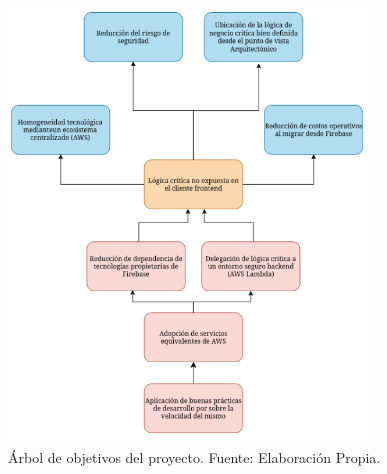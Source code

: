 \newcommand\arbolDeObjetivosCaption{Árbol de objetivos del proyecto. \hspace{1em}}
\begin{figure}[H]
  \centering
  \includegraphics[width=0.85\textwidth]{img/figures/fig7-arbol-de-objetivos.png}
  \caption[\arbolDeObjetivosCaption]{\arbolDeObjetivosCaption Fuente: Elaboración Propia.}
  \label{fig:arbol_de_objetivos}
\end{figure}
